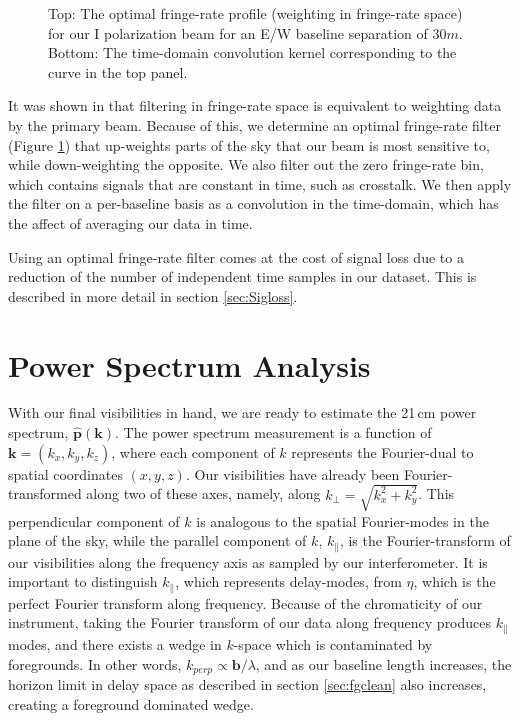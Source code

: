 \documentclass[preprint2,numberedappendix,tighten,twocolappendix]{aastex6}  %
\begin{document}
\begin{figure}[!]
	\centering
	\caption{Top: The optimal fringe-rate profile (weighting in fringe-rate space) for our I polarization beam for an E/W baseline separation of $30 m$. Bottom: The time-domain convolution kernel corresponding to the curve in the top panel.}
	\label{fig:frf}
\end{figure}

It was shown in \citet{parsons_et_al2016} that filtering in fringe-rate space is equivalent to weighting data by the primary beam. Because of this, we determine an optimal fringe-rate filter (Figure \ref{fig:frf}) that up-weights parts of the sky that our beam is most sensitive to, while down-weighting the opposite. We also filter out the zero fringe-rate bin, which contains signals that are constant in time, such as crosstalk. We then apply the filter on a per-baseline basis as a convolution in the time-domain, which has the affect of averaging our data in time. 

Using an optimal fringe-rate filter comes at the cost of signal loss due to a reduction of the number of independent time samples in our dataset. This is described in more detail in section \ref{sec:Sigloss}.

\section{Power Spectrum Analysis}
\label{sec:PS}

With our final visibilities in hand, we are ready to estimate the 21\,cm power spectrum, $\hat{\textbf{p}}(\textbf{k})$. The power spectrum measurement is a function of $\textbf{k} = (k_{x},k_{y},k_{z})$, where each component of $k$ represents the Fourier-dual to spatial coordinates $(x,y,z)$. Our visibilities have already been Fourier-transformed along two of these axes, namely, along $k_{\perp} = \sqrt{k_{x}^{2}+k_{y}^{2}}$. This perpendicular component of $k$ is analogous to the spatial Fourier-modes in the plane of the sky, while the parallel component of $k$, $k_{\parallel}$, is the Fourier-transform of our visibilities along the frequency axis as sampled by our interferometer. It is important to distinguish $k_{\parallel}$, which represents delay-modes, from $\eta$, which is the perfect Fourier transform along frequency. Because of the chromaticity of our instrument, taking the Fourier transform of our data along frequency produces $k_{\parallel}$ modes, and there exists a wedge in $k$-space which is contaminated by foregrounds. In other words, $k_{perp} \propto \textbf{b}/{\lambda}$, and as our baseline length increases, the horizon limit in delay space as described in section \ref{sec:fgclean} also increases, creating a foreground dominated wedge.
\end{document}
